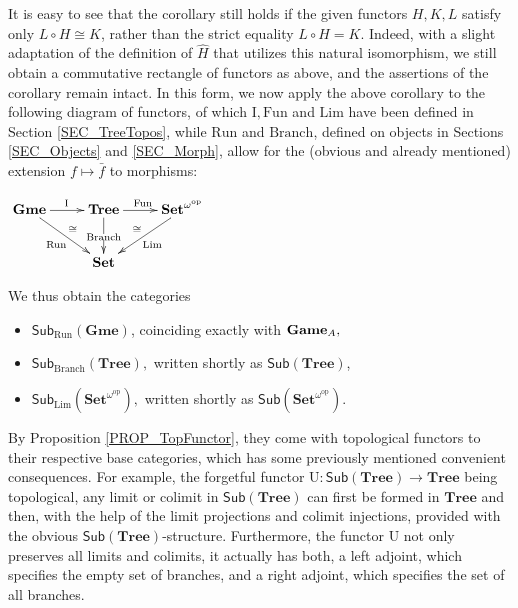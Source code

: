 \documentclass[12pt]{amsart}
\theoremstyle{definition}
\newcommand{\A}{\textup{\textmd{\textsc{A}}}}
\newcommand{\Sets}{\mathbf{Set}}
\newcommand{\Tree}{\mathbf{Tree}}
\newcommand{\Games}{\mathbf{Game}}
\newcommand{\Gmes}{\mathbf{Gme}}
\newcommand{\SetNop}{\Sets^{\omega^{\op}}}
\newcommand{\Sub}[1]{\mathsf{Sub}\left({#1}\right)}
\newcommand{\op}{\mathrm{op}}
\begin{document}
It is easy to see that the corollary still holds if the given functors $H,K,L$ satisfy only $L\circ H\cong K$, rather than the strict equality $L\circ H=K$. Indeed, with a slight adaptation of the definition of $\widehat{H}$ that utilizes this natural isomorphism, we still obtain a commutative rectangle of functors as above, and the assertions of the corollary remain intact. In this form, we now apply the above corollary to the following diagram of functors, of which $\mathrm I, \mathrm{Fun}$ and $\mathrm{Lim}$ have been defined in Section \ref{SEC_TreeTopos}, while $\mathrm{Run}$ and $\mathrm{Branch}$, defined on objects in Sections \ref{SEC_Objects} and \ref{SEC_Morph}, allow for the (obvious and already mentioned) extension $f\mapsto\bar{f}$ to morphisms:

\begin{center}
	$\xymatrix{\Gmes\ar[r]^{\mathrm I}\ar[rd]_{\mathrm{Run}}^{\cong} & \Tree\ar[r]^{\mathrm{Fun}}\ar[d]|{\mathrm{Branch}} & \SetNop\ar[ld]^{\mathrm{Lim}}_{\cong}\\
		& \Sets & \\
	}$
\end{center}



We thus obtain the categories
\begin{itemize}
	\item $\mathsf{Sub}_{\mathrm{Run}}(\Gmes)$, coinciding exactly with $\Games_{\A},$
	\item $\mathsf{Sub}_{\mathrm{Branch}}(\Tree),$ written shortly as $\mathsf{Sub}(\Tree)$,
	\item $\mathsf{Sub}_{\mathrm{Lim}}(\SetNop),$ written shortly as $\mathsf{Sub}(\SetNop).$
\end{itemize}



By Proposition \ref{PROP_TopFunctor}, they come with topological functors to their respective base categories, which has some previously mentioned convenient consequences. For example, the forgetful functor $\mathrm{U}\colon\Sub{\Tree}\to\Tree$ being topological, any limit or colimit in $ \Sub{\Tree}$ can first be formed in $\Tree$ and then, with the help of the limit projections and colimit injections, provided with the obvious $\Sub{\Tree}$-structure. Furthermore, the functor $\mathrm{U}$ not only preserves all limits and colimits, it actually has both, a 
left adjoint, which specifies the empty set of branches, and a right adjoint, which specifies the set of all branches. 
\end{document}
